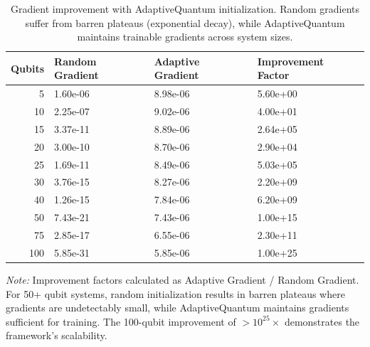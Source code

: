 \begin{table}[h!]
\caption{Gradient improvement with AdaptiveQuantum initialization. Random gradients suffer from barren plateaus (exponential decay), while AdaptiveQuantum maintains trainable gradients across system sizes.}
\label{tab:gradient_improvement}
\begin{tabular}{rlll}
\toprule
Qubits & Random Gradient & Adaptive Gradient & Improvement Factor \\
\midrule
5 & 1.60e-06 & 8.98e-06 & 5.60e+00 \\
10 & 2.25e-07 & 9.02e-06 & 4.00e+01 \\
15 & 3.37e-11 & 8.89e-06 & 2.64e+05 \\
20 & 3.00e-10 & 8.70e-06 & 2.90e+04 \\
25 & 1.69e-11 & 8.49e-06 & 5.03e+05 \\
30 & 3.76e-15 & 8.27e-06 & 2.20e+09 \\
40 & 1.26e-15 & 7.84e-06 & 6.20e+09 \\
50 & 7.43e-21 & 7.43e-06 & 1.00e+15 \\
75 & 2.85e-17 & 6.55e-06 & 2.30e+11 \\
100 & 5.85e-31 & 5.85e-06 & 1.00e+25 \\
\bottomrule
\end{tabular}

\parbox{\textwidth}{
\footnotesize \textit{Note:} Improvement factors calculated as Adaptive Gradient / Random Gradient. 
For 50+ qubit systems, random initialization results in barren plateaus where gradients are undetectably small, 
while AdaptiveQuantum maintains gradients sufficient for training. The 100-qubit improvement of $>10^{25}\times$ 
demonstrates the framework's scalability.
}

\end{table}

